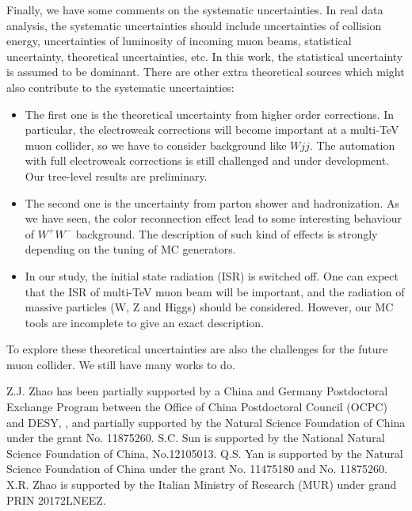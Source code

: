 \documentclass[a4paper,11pt]{article}
\begin{document}
Finally, we have some comments on the systematic uncertainties. In real data analysis, the systematic uncertainties should include uncertainties of collision energy, uncertainties of luminosity of incoming muon beams, statistical uncertainty, theoretical uncertainties, etc. In this work, the statistical uncertainty is assumed to be dominant. 
There are other extra theoretical sources which might also contribute to the systematic uncertainties: 
\begin{itemize}
  \item The first one is the theoretical uncertainty from higher order corrections. 
In particular, the electroweak corrections will become important at a multi-TeV muon collider, 
so we have to consider background like $Wjj$.
The automation with full electroweak corrections is still challenged and under development. 
Our tree-level results are preliminary.
  \item The second one is the uncertainty from parton shower and hadronization. 
As we have seen, the color reconnection effect lead to some interesting behaviour of $W^+W^-$ background. 
The description of such kind of effects is strongly depending on the tuning of MC generators.
  \item In our study, the initial state radiation (ISR) is switched off. 
One can expect that the ISR of multi-TeV muon beam will be important, 
and the radiation of massive particles (W, Z and Higgs) should be considered. 
However, our MC tools are incomplete to give an exact description. 
\end{itemize}
To explore these theoretical uncertainties are also the challenges for the future muon collider. 
We still have many works to do.

	\begin{acknowledgments}
                Z.J. Zhao has been partially supported by a 
                China and Germany Postdoctoral Exchange Program between the Office of China Postdoctoral Council (OCPC) and DESY,
		, and partially supported by the Natural Science
		Foundation of China under the grant No. 11875260. 
		S.C. Sun is supported by the National Natural Science Foundation of China, No.12105013.
		Q.S. Yan is supported by the Natural Science Foundation of China
		under the grant No.  11475180 and No. 11875260.
		X.R. Zhao is supported by the Italian Ministry of Research (MUR) under grand PRIN 20172LNEEZ.

	\end{acknowledgments}

\appendix
	
\end{document}
